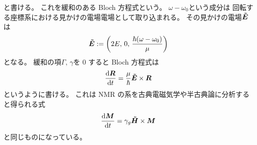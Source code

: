 \documentclass[11pt,dvipdfmx,a4paper]{jsarticle}
\begin{document}
と書ける。
これを緩和のある Bloch 方程式という。
\(\omega-\omega_0\)という成分は
回転する座標系における見かけの電場電場として取り込まれる。
その見かけの電場\({\vb*{\tilde{E}}}\)は
\begin{equation}
	\vb*{\tilde{E}} := \qty(2E,\,0,\,\frac{\hbar(\omega-\omega_0)}{\mu})
\end{equation}
となる。
緩和の項\(\Gamma,\,\gamma\)を 0 すると
Bloch 方程式は
\begin{equation}
	\dv{\vb*{R}}{t} = \frac{\mu}{\hbar}\vb*{\tilde{E}}\times\vb*{R}
\end{equation}
というように書ける。
これは NMR の系を古典電磁気学や半古典論に分析すると得られる式
\begin{equation}
	\dv{\vb*{M}}{t} = \gamma_g \vb*{\tilde{H}} \times \vb*{M}
\end{equation}
と同じものになっている。




\end{document}
